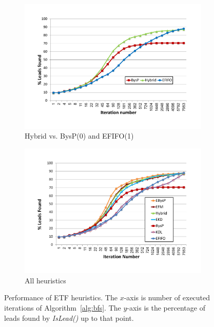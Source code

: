 \documentclass[journal]{IEEEtran}
\newcommand{\islead}[1]{{\em IsLead(#1)}}
\begin{document}
\begin{figure}[t]

\begin{subfigure}{0.5\columnwidth}%
\centering
\includegraphics[width=\textwidth, trim={2.0cm 2.5cm 2.5cm 2.0cm},clip]{PROMISE_FIFONL_HYBRID.pdf}
\caption{\label{fig:PROMISE_FIFONL_HYBRID}Hybrid vs. BysP(0) and EFIFO(1)}%
\end{subfigure}
\begin{subfigure}{0.5\columnwidth}
\centering
\includegraphics[width=\textwidth, trim={2.0cm 2.5cm 2.5cm 2.0cm},clip]{all_nl_with_promise.pdf}%
\caption{\label{fig:all-nl}All heuristics}%
\end{subfigure}%

\caption{Performance of ETF heuristics. The $x$-axis is number of executed iterations of Algorithm~\ref{alg:bfs}. The $y$-axis is the percentage of leads found by \islead{} up to that point.}
\end{figure}
\end{document}
